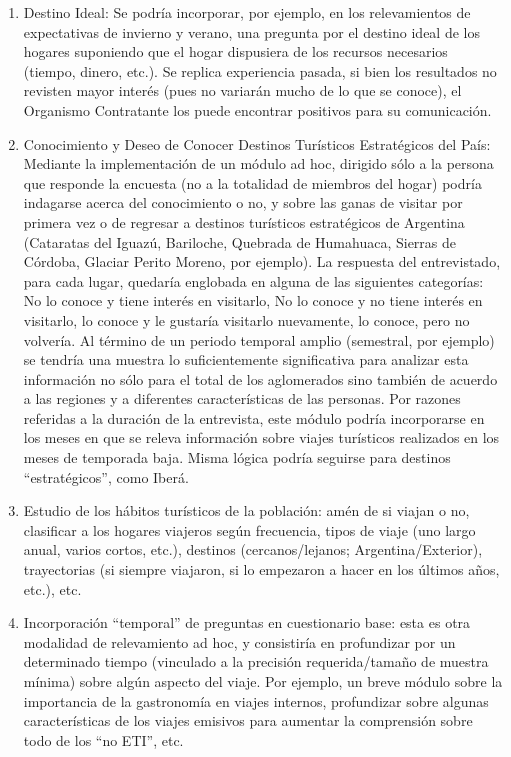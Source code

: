 \documentclass[
  openany]{book}
\begin{document}
\begin{enumerate}
\def\labelenumi{\arabic{enumi}.}
\item
  Destino Ideal: Se podría incorporar, por ejemplo, en los relevamientos de expectativas de invierno y verano, una pregunta por el destino ideal de los hogares suponiendo que el hogar dispusiera de los recursos necesarios (tiempo, dinero, etc.).
  Se replica experiencia pasada, si bien los resultados no revisten mayor interés (pues no variarán mucho de lo que se conoce), el Organismo Contratante los puede encontrar positivos para su comunicación.
\item
  Conocimiento y Deseo de Conocer Destinos Turísticos Estratégicos del País: Mediante la implementación de un módulo ad hoc, dirigido sólo a la persona que responde la encuesta (no a la totalidad de miembros del hogar) podría indagarse acerca del conocimiento o no, y sobre las ganas de visitar por primera vez o de regresar a destinos turísticos estratégicos de Argentina (Cataratas del Iguazú, Bariloche, Quebrada de Humahuaca, Sierras de Córdoba, Glaciar Perito Moreno, por ejemplo).
  La respuesta del entrevistado, para cada lugar, quedaría englobada en alguna de las siguientes categorías: No lo conoce y tiene interés en visitarlo, No lo conoce y no tiene interés en visitarlo, lo conoce y le gustaría visitarlo nuevamente, lo conoce, pero no volvería.
  Al término de un periodo temporal amplio (semestral, por ejemplo) se tendría una muestra lo suficientemente significativa para analizar esta información no sólo para el total de los aglomerados sino también de acuerdo a las regiones y a diferentes características de las personas.
  Por razones referidas a la duración de la entrevista, este módulo podría incorporarse en los meses en que se releva información sobre viajes turísticos realizados en los meses de temporada baja.
  Misma lógica podría seguirse para destinos ``estratégicos'', como Iberá.
\item
  Estudio de los hábitos turísticos de la población: amén de si viajan o no, clasificar a los hogares viajeros según frecuencia, tipos de viaje (uno largo anual, varios cortos, etc.), destinos (cercanos/lejanos; Argentina/Exterior), trayectorias (si siempre viajaron, si lo empezaron a hacer en los últimos años, etc.), etc.
\item
  Incorporación ``temporal'' de preguntas en cuestionario base: esta es otra modalidad de relevamiento ad hoc, y consistiría en profundizar por un determinado tiempo (vinculado a la precisión requerida/tamaño de muestra mínima) sobre algún aspecto del viaje.
  Por ejemplo, un breve módulo sobre la importancia de la gastronomía en viajes internos, profundizar sobre algunas características de los viajes emisivos para aumentar la comprensión sobre todo de los ``no ETI'', etc.
\end{enumerate}
\end{document}
